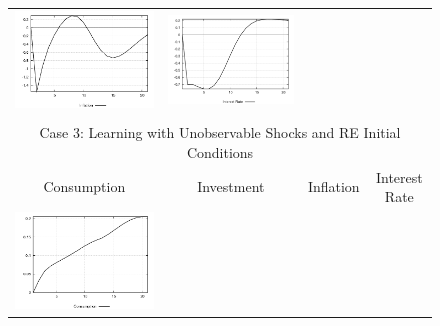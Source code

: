 \begin{figure}
\begin{tabular}{cccc}
\includegraphics[scale=0.22]{results_reallinit/Inflation_techshock_irf.png} & 
\includegraphics[scale=0.22]{results_reallinit/Interest_Rate_techshock_irf.png} \\ \\ 
\multicolumn{4}{c}{Case 3: Learning with Unobservable Shocks and RE Initial Conditions}\\
Consumption & Investment & Inflation & Interest Rate \\ 
\includegraphics[scale=0.22]{results_reinit/Consumption_techshock_irf.png} & 

\end{tabular}
\end{figure}
